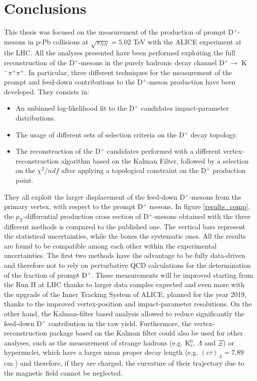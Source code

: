 \documentclass[b5paper,10pt,twoside,oldstyle,classica]{toptesi}
\newcommand{\pt}{p_\text{T}}
\begin{document}
\chapter{Conclusions}
This thesis was focused on the measurement of the production of prompt D$^+$-mesons in p-Pb collisions at $\sqrt{s_{NN}}=5.02$ TeV with the ALICE experiment at the LHC. All the analyses presented have been performed exploiting the full reconstruction of the D$^+$-mesons in the purely hadronic decay channel D$^+\rightarrow$ K$^-\pi^+\pi^+$. In particular, three different techniques for the measurement of the prompt and feed-down contributions to the D$^+$-meson production have been developed. They consists in:  
\begin{itemize}
 \item An unbinned log-likelihood fit to the D$^+$ candidates impact-parameter distributions.
 \item The usage of different sets of selection criteria on the D$^+$ decay topology.
 \item The reconstruction of the D$^+$ candidates performed with a different vertex-reconstruction algorithm based on the Kalman Filter, followed by a selection on the $\chi^2/ndf$ after applying a topological constraint on the D$^+$ production point.  
\end{itemize}
They all exploit the larger displacement of the feed-down D$^+$-mesons from the primary vertex, with respect to the prompt D$^+$ mesons.
In figure \ref{results_comp}, the $\pt$-differential production cross section of D$^+$-mesons obtained with the three different methods is compared to the published one. The vertical bars represent the statistical uncertainties, while the boxes the systematic ones. All the results are found to be compatible among each other within the experimental uncertainties. The first two methods have the advantage to be fully data-driven and therefore not to rely on perturbative QCD calculations for the determination of the fraction of prompt D$^+$. These measurements will be improved starting from the Run II at LHC thanks to larger data samples expected and even more with the upgrade of the Inner Tracking System of ALICE, planned for the year 2019, thanks to the improved vertex-position and impact-parameter resolutions. On the other hand, the Kalman-filter based analysis allowed to reduce significantly the feed-down D$^+$ contribution in the raw yield. Furthermore, the vertex-reconstruction package based on the Kalman filter could also be used for other analyses, such as the measurement of strange hadrons (e.g. K$_s^0$, $\Lambda$ and $\Xi$) or hypernuclei, which have a larger mean proper decay length (e.g. $(c\tau)_{\Lambda}=7.89$ cm \cite{Agashe:2014kda}) and therefore, if they are charged, the curvature of their trajectory due to the magnetic field cannot be neglected.  
\end{document}
